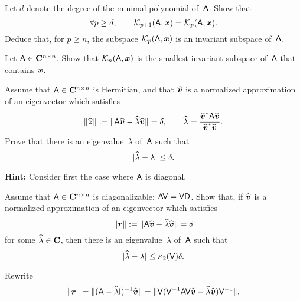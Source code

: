 \begin{exercise}
    Let $d$ denote the degree of the minimal polynomial of~$\mathsf A$.
    Show that
    \[
        \forall p \geq d, \qquad
        \mathcal K_{p+1}(\mathsf A, \mathbf{\boldsymbol{x}}) =
        \mathcal K_{p}(\mathsf A, \mathbf{\boldsymbol{x}}).
    \]
    Deduce that, for $p \geq n$,
    the subspace $\mathcal K_{p}(\mathsf A, \mathbf{\boldsymbol{x}})$ is an invariant subspace of~$\mathsf A$.
\end{exercise}

\begin{exercise}
    Let $\mathsf A \in \mathbf C^{n \times n}$.
    Show that $\mathcal K_{n}(\mathsf A, \mathbf{\boldsymbol{x}})$ is the smallest invariant subspace of~$\mathsf A$ that contains $\mathbf{\boldsymbol{x}}$.
\end{exercise}

\begin{exercise}
    \label{exercise:a_posteriori_1}
    Assume that $\mathsf A \in \mathbf C^{n \times n}$ is Hermitian,
    and that $\widehat {\mathbf{\boldsymbol{v}}}$ is a normalized approximation of an eigenvector which satisfies
    \[
        \lVert\widehat {\mathbf{\boldsymbol{z}}}\rVert :=  \lVert\mathsf A \widehat {\mathbf{\boldsymbol{v}}} - \widehat \lambda \widehat {\mathbf{\boldsymbol{v}}}\rVert = \delta,
        \qquad \widehat \lambda = \frac{\widehat {\mathbf{\boldsymbol{v}}}^* \mathsf A \widehat {\mathbf{\boldsymbol{v}}}}{\widehat {\mathbf{\boldsymbol{v}}}^* \widehat {\mathbf{\boldsymbol{v}}}}.
    \]
    Prove that there is an eigenvalue~$\lambda$ of~$\mathsf A$ such that
    \[
        \lvert\widehat \lambda - \lambda\rvert \leq \delta.
    \]

    \noindent \textbf{Hint:} Consider first the case where $\mathsf A$ is diagonal.
\end{exercise}

\begin{exercise}
    \label{exercise:a_posteriori_2}
    Assume that $\mathsf A \in \mathbf C^{n \times n}$ is diagonalizable: $\mathsf A \mathsf V = \mathsf V \mathsf D$.
    Show that, if $\widehat {\mathbf{\boldsymbol{v}}}$ is a normalized approximation of an eigenvector which satisfies
    \[
        \lVert\mathbf{\boldsymbol{r}}\rVert :=  \lVert\mathsf A \widehat {\mathbf{\boldsymbol{v}}} - \widehat \lambda \widehat {\mathbf{\boldsymbol{v}}}\rVert = \delta
    \]
    for some $\widehat \lambda \in \mathbf C$,
    then there is an eigenvalue~$\lambda$ of~$\mathsf A$ such that
    \[
        \lvert\widehat \lambda - \lambda\rvert \leq \kappa_2(\mathsf V) \delta.
    \]

    Rewrite
    \[
        \lVert\mathbf{\boldsymbol{r}}\rVert = \lVert(\mathsf A - \widehat \lambda \mathsf I)^{-1} \widehat {\mathbf{\boldsymbol{v}}}\rVert
        = \lVert\mathsf V (\mathsf V^{-1} \mathsf A \mathsf V \widehat {\mathbf{\boldsymbol{v}}} - \widehat \lambda \widehat {\mathbf{\boldsymbol{v}}}) \mathsf V^{-1}\rVert.
    \]
\end{exercise}

